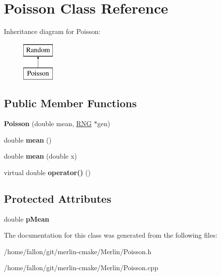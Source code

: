 \hypertarget{classPoisson}{}\section{Poisson Class Reference}
\label{classPoisson}
Inheritance diagram for Poisson\+:\begin{figure}[H]
\begin{center}
\leavevmode
\includegraphics[height=2.000000cm]{classPoisson}
\end{center}
\end{figure}
\subsection*{Public Member Functions}
\begin{DoxyCompactItemize}
\item 
\mbox{\label{classPoisson_a2434ee1f8367d7d795138519c209bec7}} 
{\bfseries Poisson} (double mean, \hyperlink{classRNG}{R\+NG} $\ast$gen)
\item 
\mbox{\label{classPoisson_a02b61c65ae798d6a3b6b6fea218037ba}} 
double {\bfseries mean} ()
\item 
\mbox{\label{classPoisson_a5a3d672a4f8dc743b73a45b8441985c2}} 
double {\bfseries mean} (double x)
\item 
\mbox{\label{classPoisson_a7ad3e76b5d0ad9f6e3a7dd80bbfecbb3}} 
virtual double {\bfseries operator()} ()
\end{DoxyCompactItemize}
\subsection*{Protected Attributes}
\begin{DoxyCompactItemize}
\item 
\mbox{\label{classPoisson_a315f2a4f65f0e1f4a44e17f9ee177a6e}} 
double {\bfseries p\+Mean}
\end{DoxyCompactItemize}


The documentation for this class was generated from the following files\+:\begin{DoxyCompactItemize}
\item 
/home/fallon/git/merlin-\/cmake/\+Merlin/Poisson.\+h\item 
/home/fallon/git/merlin-\/cmake/\+Merlin/Poisson.\+cpp\end{DoxyCompactItemize}
